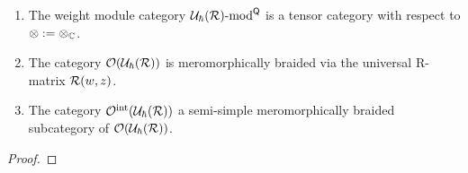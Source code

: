         \begin{definition} \label{def: category_O_loop_QUEs}
            
        \end{definition}
        \begin{lemma} \label{lemma: tensor_structure_and_semi_simplicity_of_category_O_loop_QUEs}
            \begin{enumerate}
                \item The weight module category $\mathcal{U}_{\hbar}(\mathcal{R})\text{-}\mathrm{mod}^{\mathsf{Q}}$ is a tensor category with respect to $\tensor := \tensor_{\bbC}$.
                \item The category $\mathcal{O}( \mathcal{U}_{\hbar}(\mathcal{R}) )$ is meromorphically braided via the universal R-matrix $\mathcal{R}(w, z)$.
                \item The category $\mathcal{O}^{\mathrm{int}}( \mathcal{U}_{\hbar}(\mathcal{R}) )$ a semi-simple meromorphically braided subcategory of $\mathcal{O}( \mathcal{U}_{\hbar}(\mathcal{R}) )$.
            \end{enumerate}
        \end{lemma}
            \begin{proof}
                
            \end{proof}